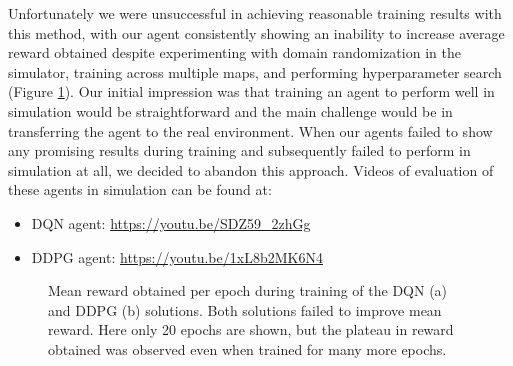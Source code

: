 \documentclass{article}
\begin{document}
Unfortunately we were unsuccessful in achieving reasonable training results with this method, with our agent consistently showing an inability to increase average reward obtained despite experimenting with domain randomization in the simulator, training across multiple maps, and performing hyperparameter search (Figure \ref{fig:rl_training}). Our initial impression was that training an agent to perform well in simulation would be straightforward and the main challenge would be in transferring the agent to the real environment. When our agents failed to show any promising results during training and subsequently failed to perform in simulation at all, we decided to abandon this approach. Videos of evaluation of these agents in simulation can be found at:
\begin{itemize}
    \item DQN agent: \url{https://youtu.be/SDZ59_2zhGg}
    \item DDPG agent: \url{https://youtu.be/1xL8b2MK6N4}
\end{itemize}

\begin{figure}[H]
\centering
    \qquad
    \caption{Mean reward obtained per epoch during training of the DQN (a) and DDPG (b) solutions. Both solutions failed to improve mean reward. Here only 20 epochs are shown, but the plateau in reward obtained was observed even when trained for many more epochs.}
    \label{fig:rl_training}
\end{figure}
\end{document}
